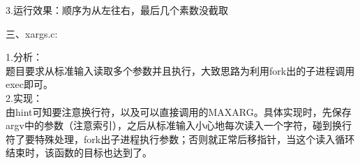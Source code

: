 \documentclass[12pt]{article}
\begin{document}
3.运行效果：顺序为从左往右，最后几个素数没截取
\begin{figure}[!h]
    \centering
    \hfill
    \hfill
\end{figure}
\newpage
\begin{large}
    \noindent 三、xargs.c:\\
\end{large}
1.分析：\\
\hspace*{2em}题目要求从标准输入读取多个参数并且执行，大致思路为利用fork出的子进程调用exec即可。\\
2.实现：\\
\hspace*{2em}由hint可知要注意换行符，以及可以直接调用的MAXARG。具体实现时，先保存argv中的参数（注意索引），之后从标准输入小心地每次读入一个字符，碰到换行符了要特殊处理，fork出子进程执行参数；否则就正常后移指针，当这个读入循环结束时，该函数的目标也达到了。
\end{document}
